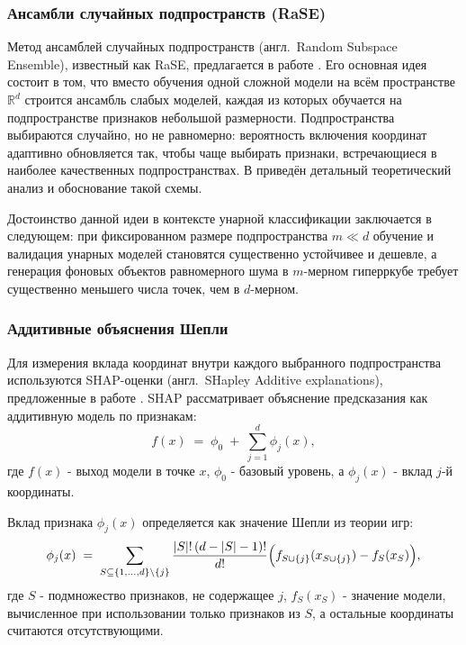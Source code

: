 \documentclass[12pt,a4paper]{article}
\begin{document}
\subsubsection{Ансамбли случайных подпространств (RaSE)}

Метод ансамблей случайных подпространств (англ.\ Random Subspace Ensemble), известный как RaSE,
предлагается в работе \cite{tian2021rase}. Его основная идея состоит в том, что вместо обучения
одной сложной модели на всём пространстве $\mathbb{R}^d$ строится ансамбль слабых моделей,
каждая из которых обучается на подпространстве признаков небольшой размерности. Подпространства
выбираются случайно, но не равномерно: вероятность включения координат адаптивно обновляется так,
чтобы чаще выбирать признаки, встречающиеся в наиболее качественных подпространствах.
В \cite{tian2021rase} приведён детальный теоретический анализ и обоснование такой схемы.

Достоинство данной идеи в контексте унарной классификации заключается в следующем:
при фиксированном размере подпространства $m\ll d$ обучение и валидация унарных моделей
становятся существенно устойчивее и дешевле, а генерация фоновых объектов равномерного шума
в $m$-мерном гиперркубе требует существенно меньшего числа точек, чем в $d$-мерном.

\subsubsection{Аддитивные объяснения Шепли}

Для измерения вклада координат внутри каждого выбранного подпространства используются SHAP-оценки
(англ.\ SHapley Additive explanations), предложенные в работе \cite{lundberg2017shap}.
SHAP рассматривает объяснение предсказания как аддитивную модель по признакам:
\begin{equation}
f(x) \;=\; \phi_0 \;+\; \sum_{j=1}^{d} \phi_j(x),
\end{equation}
где $f(x)$ - выход модели в точке $x$, $\phi_0$ - базовый уровень,
а $\phi_j(x)$ - вклад $j$-й координаты.

Вклад признака $\phi_j(x)$ определяется как значение Шепли из теории игр:
\begin{equation}
\phi_j(x)
\;=\;
\sum_{S \subseteq \{1,\dots,d\}\setminus\{j\}}
\frac{|S|!\,(d-|S|-1)!}{d!}
\Bigl(
f_{S\cup\{j\}}(x_{S\cup\{j\}}) - f_S(x_S)
\Bigr),
\end{equation}
где $S$ - подмножество признаков, не содержащее $j$,
$f_S(x_S)$ - значение модели, вычисленное при использовании только признаков из $S$,
а остальные координаты считаются отсутствующими.
\end{document}
